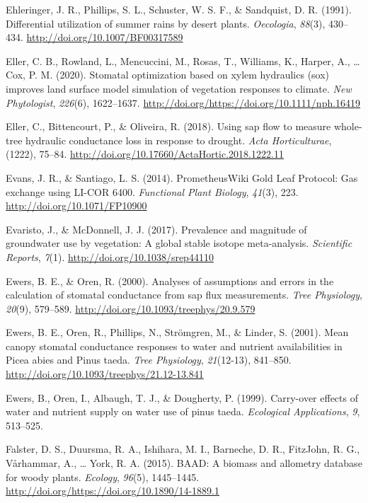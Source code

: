 \documentclass[11pt,twoside]{reedthesis}
\begin{document}
\hypertarget{ref-ehleringer_differential_1991}{}
Ehleringer, J. R., Phillips, S. L., Schuster, W. S. F., \& Sandquist, D.
R. (1991). Differential utilization of summer rains by desert plants.
\emph{Oecologia}, \emph{88}(3), 430--434.
\url{http://doi.org/10.1007/BF00317589}

\hypertarget{ref-Eller2020}{}
Eller, C. B., Rowland, L., Mencuccini, M., Rosas, T., Williams, K.,
Harper, A., \ldots{} Cox, P. M. (2020). Stomatal optimization based on
xylem hydraulics (sox) improves land surface model simulation of
vegetation responses to climate. \emph{New Phytologist}, \emph{226}(6),
1622--1637. \url{http://doi.org/https://doi.org/10.1111/nph.16419}

\hypertarget{ref-eller_using_2018}{}
Eller, C., Bittencourt, P., \& Oliveira, R. (2018). Using sap flow to
measure whole-tree hydraulic conductance loss in response to drought.
\emph{Acta Horticulturae}, (1222), 75--84.
\url{http://doi.org/10.17660/ActaHortic.2018.1222.11}

\hypertarget{ref-evans_prometheuswiki_2014}{}
Evans, J. R., \& Santiago, L. S. (2014). PrometheusWiki Gold Leaf
Protocol: Gas exchange using LI-COR 6400. \emph{Functional Plant
Biology}, \emph{41}(3), 223. \url{http://doi.org/10.1071/FP10900}

\hypertarget{ref-evaristo2017}{}
Evaristo, J., \& McDonnell, J. J. (2017). Prevalence and magnitude of
groundwater use by vegetation: A global stable isotope meta-analysis.
\emph{Scientific Reports}, \emph{7}(1).
\url{http://doi.org/10.1038/srep44110}

\hypertarget{ref-ewers_analyses_2000}{}
Ewers, B. E., \& Oren, R. (2000). Analyses of assumptions and errors in
the calculation of stomatal conductance from sap flux measurements.
\emph{Tree Physiology}, \emph{20}(9), 579--589.
\url{http://doi.org/10.1093/treephys/20.9.579}

\hypertarget{ref-Ewers2001}{}
Ewers, B. E., Oren, R., Phillips, N., Strömgren, M., \& Linder, S.
(2001). Mean canopy stomatal conductance responses to water and nutrient
availabilities in Picea abies and Pinus taeda. \emph{Tree Physiology},
\emph{21}(12-13), 841--850.
\url{http://doi.org/10.1093/treephys/21.12-13.841}

\hypertarget{ref-Ewers1999}{}
Ewers, B., Oren, I., Albaugh, T. J., \& Dougherty, P. (1999). Carry-over
effects of water and nutrient supply on water use of pinus taeda.
\emph{Ecological Applications}, \emph{9}, 513--525.

\hypertarget{ref-Falster2015}{}
Falster, D. S., Duursma, R. A., Ishihara, M. I., Barneche, D. R.,
FitzJohn, R. G., Vårhammar, A., \ldots{} York, R. A. (2015). BAAD: A
biomass and allometry database for woody plants. \emph{Ecology},
\emph{96}(5), 1445--1445.
\url{http://doi.org/https://doi.org/10.1890/14-1889.1}
\end{document}
